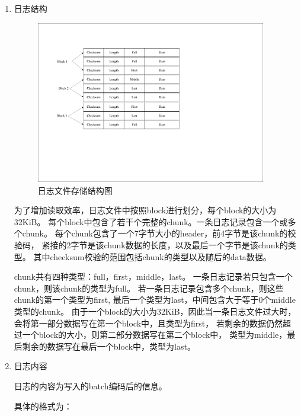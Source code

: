    \begin{enumerate}
   \item 日志结构

   \begin{figure}[H]
	   \centering
	   \includegraphics[width=0.95\textwidth]{pdf/journal.pdf}
	   \caption{日志文件存储结构图}
	   \label{journal}
   \end{figure}
   为了增加读取效率，日志文件中按照block进行划分，每个block的大小为32KiB。
   每个block中包含了若干个完整的chunk。一条日志记录包含一个或多个chunk。
   每个chunk包含了一个7字节大小的header，前4字节是该chunk的校验码，
   紧接的2字节是该chunk数据的长度，以及最后一个字节是该chunk的类型。
   其中checksum校验的范围包括chunk的类型以及随后的data数据。

   chunk共有四种类型：full，first，middle，last。
   一条日志记录若只包含一个chunk，则该chunk的类型为full。
   若一条日志记录包含多个chunk，则这些chunk的第一个类型为first, 
   最后一个类型为last，中间包含大于等于0个middle类型的chunk。
   由于一个block的大小为32KiB，因此当一条日志文件过大时，
   会将第一部分数据写在第一个block中，且类型为first，
   若剩余的数据仍然超过一个block的大小，则第二部分数据写在第二个block中，
   类型为middle，最后剩余的数据写在最后一个block中，类型为last。
   
   \item 日志内容
   
   日志的内容为写入的batch编码后的信息。

   具体的格式为：


\end{enumerate}
